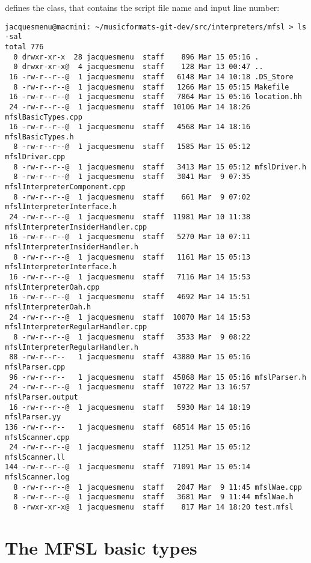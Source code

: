  defines the  class, that contains the script file name and input line number:
\begin{lstlisting}[language=TerminalSmall]
jacquesmenu@macmini: ~/musicformats-git-dev/src/interpreters/mfsl > ls -sal
total 776
  0 drwxr-xr-x  28 jacquesmenu  staff    896 Mar 15 05:16 .
  0 drwxr-xr-x@  4 jacquesmenu  staff    128 Mar 13 00:47 ..
 16 -rw-r--r--@  1 jacquesmenu  staff   6148 Mar 14 10:18 .DS_Store
  8 -rw-r--r--@  1 jacquesmenu  staff   1266 Mar 15 05:15 Makefile
 16 -rw-r--r--@  1 jacquesmenu  staff   7864 Mar 15 05:16 location.hh
 24 -rw-r--r--@  1 jacquesmenu  staff  10106 Mar 14 18:26 mfslBasicTypes.cpp
 16 -rw-r--r--@  1 jacquesmenu  staff   4568 Mar 14 18:16 mfslBasicTypes.h
  8 -rw-r--r--@  1 jacquesmenu  staff   1585 Mar 15 05:12 mfslDriver.cpp
  8 -rw-r--r--@  1 jacquesmenu  staff   3413 Mar 15 05:12 mfslDriver.h
  8 -rw-r--r--@  1 jacquesmenu  staff   3041 Mar  9 07:35 mfslInterpreterComponent.cpp
  8 -rw-r--r--@  1 jacquesmenu  staff    661 Mar  9 07:02 mfslInterpreterInterface.h
 24 -rw-r--r--@  1 jacquesmenu  staff  11981 Mar 10 11:38 mfslInterpreterInsiderHandler.cpp
 16 -rw-r--r--@  1 jacquesmenu  staff   5270 Mar 10 07:11 mfslInterpreterInsiderHandler.h
  8 -rw-r--r--@  1 jacquesmenu  staff   1161 Mar 15 05:13 mfslInterpreterInterface.h
 16 -rw-r--r--@  1 jacquesmenu  staff   7116 Mar 14 15:53 mfslInterpreterOah.cpp
 16 -rw-r--r--@  1 jacquesmenu  staff   4692 Mar 14 15:51 mfslInterpreterOah.h
 24 -rw-r--r--@  1 jacquesmenu  staff  10070 Mar 14 15:53 mfslInterpreterRegularHandler.cpp
  8 -rw-r--r--@  1 jacquesmenu  staff   3533 Mar  9 08:22 mfslInterpreterRegularHandler.h
 88 -rw-r--r--   1 jacquesmenu  staff  43880 Mar 15 05:16 mfslParser.cpp
 96 -rw-r--r--   1 jacquesmenu  staff  45868 Mar 15 05:16 mfslParser.h
 24 -rw-r--r--@  1 jacquesmenu  staff  10722 Mar 13 16:57 mfslParser.output
 16 -rw-r--r--@  1 jacquesmenu  staff   5930 Mar 14 18:19 mfslParser.yy
136 -rw-r--r--   1 jacquesmenu  staff  68514 Mar 15 05:16 mfslScanner.cpp
 24 -rw-r--r--@  1 jacquesmenu  staff  11251 Mar 15 05:12 mfslScanner.ll
144 -rw-r--r--@  1 jacquesmenu  staff  71091 Mar 15 05:14 mfslScanner.log
  8 -rw-r--r--@  1 jacquesmenu  staff   2047 Mar  9 11:45 mfslWae.cpp
  8 -rw-r--r--@  1 jacquesmenu  staff   3681 Mar  9 11:44 mfslWae.h
  8 -rwxr-xr-x@  1 jacquesmenu  staff    817 Mar 14 18:20 test.mfsl
\end{lstlisting}


\section{The MFSL basic types}

